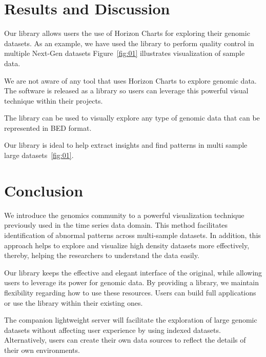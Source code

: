 \documentclass[twocolumn]{bmcart}
\begin{document}
\section*{Results and Discussion}



Our library allows users the use of Horizon Charts for exploring their genomic
datasets.  As an example, we have used the library to perform quality control
in multiple Next-Gen datasets Figure~\ref{fig:01} illustrates visualization of
sample data.


We are not aware of any tool that uses Horizon Charts to explore genomic data.
The software is released as a library so users can leverage this powerful
visual technique within their projects.


The library can be used to visually explore any type of genomic data that can
be represented in BED format. 


Our library is ideal to help extract insights and find patterns in multi sample
large datasets~\ref{fig:01}.


\section*{Conclusion}


We introduce the genomics community to a powerful visualization technique
previously used in the time series data domain. This method facilitates
identification of abnormal patterns across multi-sample datasets.  In addition, this
approach helps to explore and visualize high density datasets more effectively,
thereby, helping the researchers to understand the data easily.

Our library keeps the effective and elegant interface of the original,
while allowing users to leverage its power for genomic data. By providing a
library, we maintain flexibility regarding how to use these resources. Users
can build full applications or use the library within their existing ones.

The companion lightweight server will facilitate the exploration of large
genomic datasets without affecting user experience by using indexed datasets.
Alternatively, users can create their own data sources to reflect the details
of their own environments.
\end{document}
